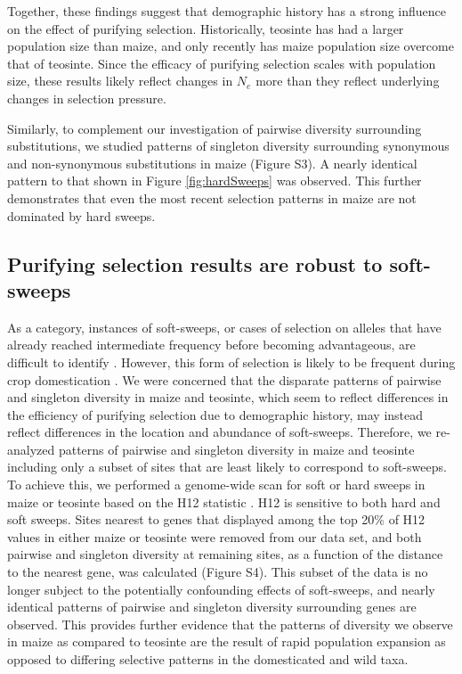 \documentclass{pnastwo}
\begin{document}
\begin{article}
Together, these findings suggest that demographic history has
a strong influence on the effect of purifying selection. Historically,
teosinte has had a larger population size than maize, and only
recently has maize population size overcome that of teosinte. Since
the efficacy of purifying selection scales with population size,
these results likely reflect changes in $N_e$ more than they reflect
underlying changes in selection pressure.

Similarly, to complement our investigation of pairwise diversity surrounding substitutions, we studied patterns of singleton diversity surrounding synonymous and non-synonymous substitutions in maize (Figure S3). A nearly identical pattern to that shown in Figure \ref{fig:hardSweeps} was observed. This further demonstrates that even the most recent selection patterns in maize are not dominated by hard sweeps.



\subsection{Purifying selection results are robust to soft-sweeps}
As a category, instances of soft-sweeps, or cases of selection on alleles that have already reached intermediate frequency before becoming advantageous, are difficult to identify \cite{wilson2014}. However, this form of selection is likely to be frequent during crop domestication \cite{innan2004}. We were concerned that the disparate patterns of pairwise and singleton diversity in maize and teosinte, which seem to reflect differences in the efficiency of purifying selection due to demographic history, may instead reflect differences in the location and abundance of soft-sweeps. Therefore, we re-analyzed patterns of pairwise and singleton diversity in maize and teosinte including only a subset of sites that are least likely to correspond to soft-sweeps. To achieve this, we performed a genome-wide scan for soft or hard sweeps in maize or teosinte based on the H12 statistic \cite{garud2015}. H12 is sensitive to both hard and soft sweeps. Sites nearest to genes that displayed among the top 20\% of H12 values in either maize or teosinte were removed from our data set, and both pairwise and singleton diversity at remaining sites, as a function of the distance to the nearest gene, was calculated (Figure S4). This subset of the data is no longer subject to the potentially confounding effects of soft-sweeps, and nearly identical patterns of pairwise and singleton diversity surrounding genes are observed. This provides further evidence that the patterns of diversity we observe in maize as compared to teosinte are the result of rapid population expansion as opposed to differing selective patterns in the domesticated and wild taxa.


\end{article}
\end{document}
